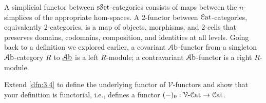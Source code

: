 A simplicial functor between $\mathrm{s}\mathcal{S}\mathrm{et}$-categories consists of maps between the $n$-simplices of the appropriate hom-spaces. A 2-functor between $\mathcal{C}\mathrm{at} $-categories, equivalently 2-categories, is a map of objects, morphisms, and 2-cells that preserves domains, codomains, composition, and identities at all levels. Going back to a definition we explored earlier, a covariant $\mathcal{A}\mathrm{b}$-functor from a singleton $\mathcal{A}\mathrm{b}$-category $R$ to $\underline{\mathcal{A}\mathrm{b}} $ is a left $R$-module; a contravariant $\mathcal{A}\mathrm{b}$-functor is a right $R$-module.

\begin{exercise}
	Extend \cref{dfn:3.4} to define the underlying functor of $\mathcal{V} $-functors and show that your definition is functorial, i.e., defines a functor $(-)_0: \mathcal{V} \text{-}\mathcal{C}\mathrm{at}  \to \mathcal{C}\mathrm{at} $.
\end{exercise}
